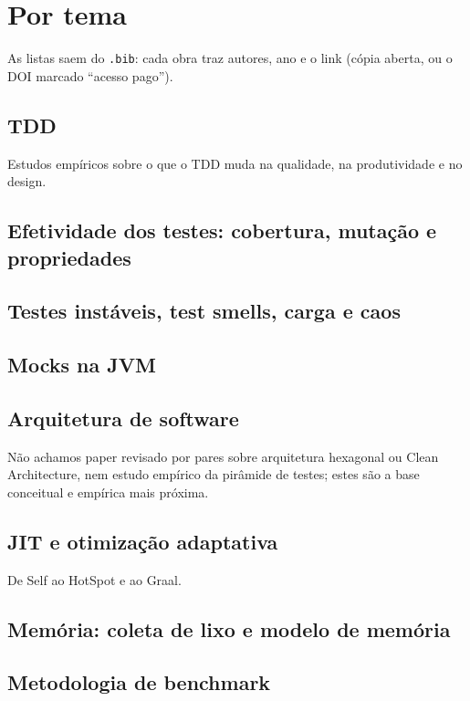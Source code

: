 \section{Por tema}
As listas saem do \texttt{.bib}: cada obra traz autores, ano e o link
(cópia aberta, ou o DOI marcado \enquote{acesso pago}).

\subsection{TDD}
Estudos empíricos sobre o que o TDD muda na qualidade, na produtividade e
no design.

\subsection{Efetividade dos testes: cobertura, mutação e propriedades}

\subsection{Testes instáveis, test smells, carga e caos}

\subsection{Mocks na JVM}

\subsection{Arquitetura de software}
Não achamos paper revisado por pares sobre arquitetura hexagonal ou Clean
Architecture, nem estudo empírico da pirâmide de testes; estes são a base
conceitual e empírica mais próxima.

\subsection{JIT e otimização adaptativa}
De Self ao HotSpot e ao Graal.

\subsection{Memória: coleta de lixo e modelo de memória}

\subsection{Metodologia de benchmark}

